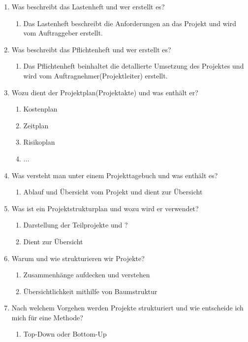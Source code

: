\documentclass[12pt,a4paper]{article}
\begin{document}
\begin{enumerate}
\begin{enumerate}
	\end{enumerate}
	\item Was beschreibt das Lastenheft und wer erstellt es?
	\begin{enumerate}
		\item Das Lastenheft beschreibt die Anforderungen an das Projekt und wird vom Auftraggeber erstellt.
	\end{enumerate}
	\item Was beschreibt das Pflichtenheft und wer erstellt es?
	\begin{enumerate}
		\item Das Pflichtenheft beinhaltet die detallierte Umsetzung des Projektes und wird vom Auftragnehmer(Projektleiter) erstellt.
	\end{enumerate}
	\item Wozu dient der Projektplan(Projektakte) und was enthält er?
	\begin{enumerate}
		\item Kostenplan
		\item Zeitplan
		\item Risikoplan
		\item ...
	\end{enumerate}
	\item Was versteht man unter einem Projekttagebuch und was enthält es?
	\begin{enumerate}
		\item Ablauf und Übersicht vom Projekt und dient zur Übersicht
	\end{enumerate}
	\item Was ist ein Projektstrukturplan und wozu wird er verwendet?
	\begin{enumerate}
		\item Darstellung der Teilprojekte und ? 
		\item Dient zur Übersicht
	\end{enumerate}
	\item Warum und wie strukturieren wir Projekte?
	\begin{enumerate}
		\item Zusammenhänge aufdecken und verstehen
		\item Übersichtlichkeit mithilfe von Baumstruktur
	\end{enumerate}
	\item Nach welchem Vorgehen werden Projekte strukturiert und wie entscheide ich mich für eine Methode?
	\begin{enumerate}
		\item Top-Down oder Bottom-Up

\end{enumerate}
\end{enumerate}
\end{document}
